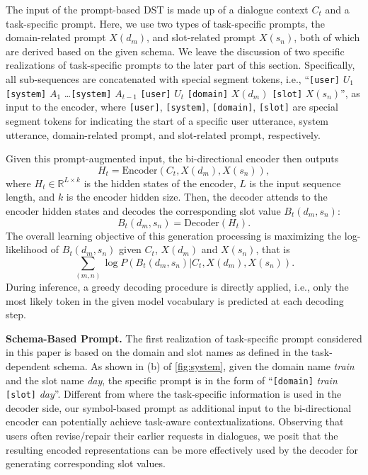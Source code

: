 \documentclass[11pt]{article}
\begin{document}
The input of the prompt-based DST is made up of a dialogue context $C_t$ and a task-specific prompt.
Here, we use two types of task-specific prompts, the domain-related prompt $X(d_m)$, and slot-related prompt $X(s_n)$, both of which are derived based on the given schema. We leave the discussion of two specific realizations of task-specific prompts to the later part of this section.
Specifically, all sub-sequences are concatenated with special segment tokens, i.e.,
``\texttt{[user]} $U_1$ \texttt{[system]} $A_1$ \ldots \texttt{[system]} $A_{t-1}$ \texttt{[user]} $U_t$ \texttt{[domain]} $X(d_m)$ \texttt{[slot]} $X(s_n)$'',
as input to the encoder, where \texttt{[user]}, \texttt{[system]}, \texttt{[domain]}, \texttt{[slot]} are special segment tokens for indicating the start of a specific user utterance, system utterance, domain-related prompt, and slot-related prompt, respectively.

Given this prompt-augmented input, the bi-directional encoder then outputs
\begin{equation}
    H_t = \text{Encoder}(C_t, X(d_m), X(s_n)),
\end{equation}
where $H_t\in\mathbb{R}^{L\times k}$ is the hidden states of the encoder, $L$ is the input sequence length, and $k$ is the encoder hidden size.
Then, the decoder attends to the encoder hidden states and decodes the corresponding slot value $B_t(d_m, s_n)$:
\begin{equation}
    B_t(d_m, s_n) = \text{Decoder}(H_t).
\end{equation}
The overall learning objective of this generation processing is maximizing the log-likelihood of $B_t(d_m, s_n)$ given $C_t$, $X(d_m)$ and $X(s_n)$, that is
\begin{equation}
\sum_{(m, n)} \log P(B_t(d_m, s_n)|C_t, X(d_m), X(s_n)).
\end{equation}
During inference, a greedy decoding procedure is directly applied, i.e., only the most likely token in the given model vocabulary is predicted at each decoding step.

\noindent
\textbf{Schema-Based Prompt.}
The first realization of task-specific prompt considered in this paper is based on the domain and slot names as defined in the task-dependent schema.
As shown in (b) of \autoref{fig:system}, given the domain name \textit{train} and the slot name \textit{day}, the specific prompt is in the form of
``\texttt{[domain]} \textit{train} \texttt{[slot]} \textit{day}''.
Different from \cite{lin-etal-2020-mintl,wu2019transferable} where the task-specific information is used in the decoder side, our symbol-based prompt as additional input to the bi-directional encoder can potentially achieve task-aware contextualizations.
Observing that users often revise/repair their earlier requests in dialogues, we posit that the resulting encoded representations can be more effectively used by the decoder for generating corresponding slot values.
\end{document}
